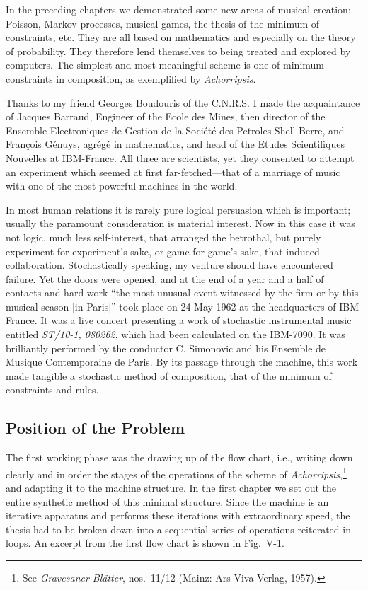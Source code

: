 \documentclass[letterpaper, 11pt]{article}
\begin{document}
In the preceding chapters we demonstrated some new areas of musical creation: Poisson, Markov
processes, musical games, the thesis of the minimum of constraints, etc. They are all based on
mathematics and especially on the theory of probability. They therefore lend themselves to being
treated and explored by computers. The simplest and most meaningful scheme is one of minimum
constraints in composition, as exemplified by \textit{Achorripsis}.

Thanks to my friend Georges Boudouris of the C.N.R.S. I made the acquaintance of Jacques Barraud,
Engineer of the Ecole des Mines, then director of the Ensemble Electroniques de Gestion de la
Société des Petroles Shell-Berre, and François Génuys, agrégé in mathematics, and head of the Etudes
Scientifiques Nouvelles at IBM-France. All three are scientists, yet they consented to attempt an
experiment which seemed at first far-fetched---that of a marriage of music with one of the most
powerful machines in the world.

In most human relations it is rarely pure logical persuasion which is important; usually the
paramount consideration is material interest. Now in this case it was not logic, much less
self-interest, that arranged the betrothal, but purely experiment for experiment's sake, or game for
game's sake, that induced collaboration. Stochastically speaking, my venture should have encountered
failure. Yet the doors were opened, and at the end of a year and a half of contacts and hard work
``the most unusual event witnessed by the firm or by this musical season [in Paris]'' took place on
24 May 1962 at the headquarters of IBM-France. It was a live concert presenting a work of stochastic
instrumental music entitled \textit{ST/10-1, 080262}, which had been calculated on the IBM-7090. It
was brilliantly performed by the conductor C. Simonovic and his Ensemble de Musique Contemporaine de
Paris. By its passage through the machine, this work made tangible a stochastic method of
composition, that of the minimum of constraints and rules.

\subsection*{Position of the Problem}

The first working phase was the drawing up of the flow chart, i.e., writing down clearly and in
order the stages of the operations of the scheme of \textit{Achorripsis},\footnote{See
\textit{Gravesaner Blätter}, nos.\ 11/12 (Mainz: Ars Viva Verlag, 1957).} and adapting it to the
machine structure. In the first chapter we set out the entire synthetic method of this minimal
structure. Since the machine is an iterative apparatus and performs these iterations with
extraordinary speed, the thesis had to be broken down into a sequential series of operations
reiterated in loops. An excerpt from the first flow chart is shown in
\hyperref[fig:flow-chart]{Fig.\ V-1}.
\end{document}
